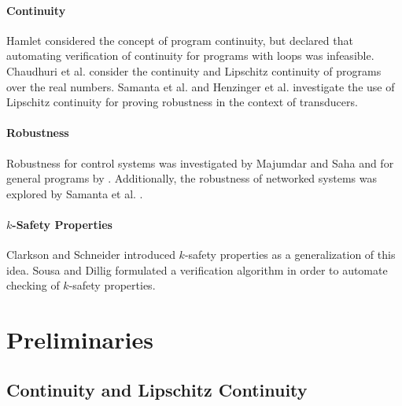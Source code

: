 \documentclass{llncs}
\begin{document}
\paragraph{Continuity} Hamlet \cite{hamlet02} considered the concept of program continuity, but declared that automating verification of continuity for programs with loops was infeasible.  Chaudhuri et al. \cite{chaudhuri10,chaudhuri11} consider the continuity and Lipschitz continuity of programs over the real numbers. Samanta et al. \cite{samanta13} and Henzinger et al. \cite{samanta14} investigate the use of Lipschitz continuity for proving robustness in the context of transducers.

\paragraph{Robustness} Robustness for control systems was investigated by Majumdar and Saha \cite{majumdar09} and for general programs by \cite{chaudhuri11}.  Additionally, the robustness of networked systems was explored by Samanta et al. \cite{samanta13a}.

\paragraph{\(k\)-Safety Properties} Clarkson and Schneider \cite{clarkson08} introduced \(k\)-safety properties as a generalization of this idea.  Sousa and Dillig \cite{sousa16} formulated a verification algorithm in order to automate checking of \(k\)-safety properties.

\section{Preliminaries}

\subsection{Continuity and Lipschitz Continuity}
\end{document}

